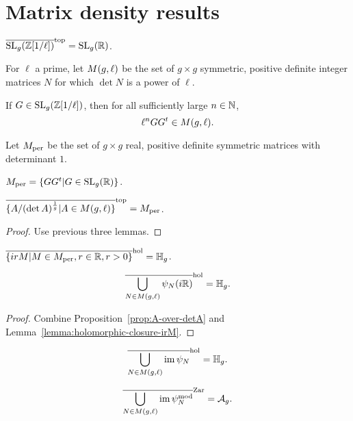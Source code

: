 \documentclass{amsart}
\begin{document}
\section{Matrix density results}
\label{sec:matr-dens-results}

\begin{lemma}
  $\overline{\operatorname{SL}_g(\mathbb{Z}[1/\ell])}^\mathrm{top} = \operatorname{SL}_g(\mathbb{R})$.
\end{lemma}

\begin{definition}
  For $\ell$ a prime, let $M(g,\ell)$ be the set of $g \times g$ symmetric, positive definite integer matrices $N$ for which $\det N$ is a power of $\ell$.
\end{definition}

\begin{lemma}
  If $G \in \operatorname{SL}_g(\mathbb{Z}[1/\ell])$, then for all sufficiently large $n \in \mathbb{N}$,
  \[
    \ell^n GG^t \in M(g,\ell).
  \]
\end{lemma}

\begin{definition}
  Let $M_{\textrm{per}}$ be the set of $g \times g$ real, positive definite symmetric matrices  with determinant $1$.
\end{definition}

\begin{lemma}
  $M_{\textrm{per}} = \{GG^t | G \in \operatorname{SL}_g(\mathbb{R})\}$.
\end{lemma}

\begin{proposition}\label{prop:A-over-detA}
  $\overline{\{A/(\det A)^{\frac{1}{g}} | A \in M(g,\ell)\}}^\mathrm{top} = M_{\textrm{per}}$.
\end{proposition}

\begin{proof}
  Use previous three lemmas.
\end{proof}

\begin{lemma}\label{lemma:holomorphic-closure-irM}
  $\overline{\{ irM | M \in M_{\textrm{per}}, r \in \mathbb{R}, r > 0\}}^\mathrm{hol} = \mathbb{H}_g$.
\end{lemma}

\begin{lemma}
  \[
    \overline{\bigcup_{N \in M(g,\ell)} \psi_N(i\mathbb{R})}^\mathrm{hol} = \mathbb{H}_g.
  \]
\end{lemma}

\begin{proof}
  Combine Proposition~\ref{prop:A-over-detA} and Lemma~\ref{lemma:holomorphic-closure-irM}.
\end{proof}

\begin{lemma}
  \[
    \overline{\bigcup_{N \in M(g,\ell)} \operatorname{im} \psi_N}^\mathrm{hol} = \mathbb{H}_g.
  \]
\end{lemma}

\begin{proposition}
  \[
    \overline{\bigcup_{N \in M(g,\ell)} \operatorname{im} \psi_N^{\textrm{mod}}}^\mathrm{Zar} = \mathcal{A}_g.
  \]
\end{proposition}
\end{document}
